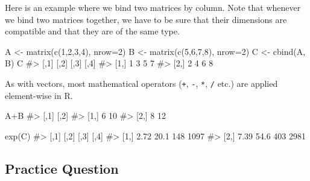 \documentclass[
  letterpaper,
]{krantz}
\makeatletter
\newenvironment{Shaded}{\begin{snugshade}}{\end{snugshade}}
\newcommand{\AttributeTok}[1]{\textcolor[rgb]{0.40,0.45,0.13}{#1}}
\newcommand{\CommentTok}[1]{\textcolor[rgb]{0.37,0.37,0.37}{#1}}
\newcommand{\DecValTok}[1]{\textcolor[rgb]{0.68,0.00,0.00}{#1}}
\newcommand{\FunctionTok}[1]{\textcolor[rgb]{0.28,0.35,0.67}{#1}}
\newcommand{\NormalTok}[1]{\textcolor[rgb]{0.00,0.23,0.31}{#1}}
\newcommand{\OtherTok}[1]{\textcolor[rgb]{0.00,0.23,0.31}{#1}}
\newcommand{\SpecialCharTok}[1]{\textcolor[rgb]{0.37,0.37,0.37}{#1}}
\newenvironment{kframe}{%
\medskip{}
\setlength{\fboxsep}{.8em}
 \def\at@end@of@kframe{}%
 \ifinner\ifhmode%
  \def\at@end@of@kframe{\end{minipage}}%
  \begin{minipage}{\columnwidth}%
 \fi\fi%
 \def\FrameCommand##1{\hskip\@totalleftmargin \hskip-\fboxsep
 \colorbox{shadecolor}{##1}\hskip-\fboxsep
     \hskip-\linewidth \hskip-\@totalleftmargin \hskip\columnwidth}%
 \MakeFramed {\advance\hsize-\width
   \@totalleftmargin\z@ \linewidth\hsize
   \@setminipage}}%
 {\par\unskip\endMakeFramed%
 \at@end@of@kframe}
\renewenvironment{Shaded}{\begin{kframe}}{\end{kframe}}
\makeatother
\begin{document}
Here is an example where we bind two matrices by column. Note that
whenever we bind two matrices together, we have to be sure that their
dimensions are compatible and that they are of the same type.

\begin{Shaded}
\begin{Highlighting}[]
\NormalTok{A }\OtherTok{\textless{}{-}} \FunctionTok{matrix}\NormalTok{(}\FunctionTok{c}\NormalTok{(}\DecValTok{1}\NormalTok{,}\DecValTok{2}\NormalTok{,}\DecValTok{3}\NormalTok{,}\DecValTok{4}\NormalTok{), }\AttributeTok{nrow=}\DecValTok{2}\NormalTok{)}
\NormalTok{B }\OtherTok{\textless{}{-}} \FunctionTok{matrix}\NormalTok{(}\FunctionTok{c}\NormalTok{(}\DecValTok{5}\NormalTok{,}\DecValTok{6}\NormalTok{,}\DecValTok{7}\NormalTok{,}\DecValTok{8}\NormalTok{), }\AttributeTok{nrow=}\DecValTok{2}\NormalTok{)}
\NormalTok{C }\OtherTok{\textless{}{-}} \FunctionTok{cbind}\NormalTok{(A, B)}
\NormalTok{C}
\CommentTok{\#\textgreater{}      [,1] [,2] [,3] [,4]}
\CommentTok{\#\textgreater{} [1,]    1    3    5    7}
\CommentTok{\#\textgreater{} [2,]    2    4    6    8}
\end{Highlighting}
\end{Shaded}

As with vectors, most mathematical operators (\texttt{+}, \texttt{-},
\texttt{*}, \texttt{/} etc.) are applied element-wise in R.

\begin{Shaded}
\begin{Highlighting}[]
\NormalTok{A}\SpecialCharTok{+}\NormalTok{B}
\CommentTok{\#\textgreater{}      [,1] [,2]}
\CommentTok{\#\textgreater{} [1,]    6   10}
\CommentTok{\#\textgreater{} [2,]    8   12}
\end{Highlighting}
\end{Shaded}

\begin{Shaded}
\begin{Highlighting}[]
\FunctionTok{exp}\NormalTok{(C)}
\CommentTok{\#\textgreater{}      [,1] [,2] [,3] [,4]}
\CommentTok{\#\textgreater{} [1,] 2.72 20.1  148 1097}
\CommentTok{\#\textgreater{} [2,] 7.39 54.6  403 2981}
\end{Highlighting}
\end{Shaded}

\hypertarget{practice-question-1}{%
\subsection{Practice Question}\label{practice-question-1}}
\end{document}
